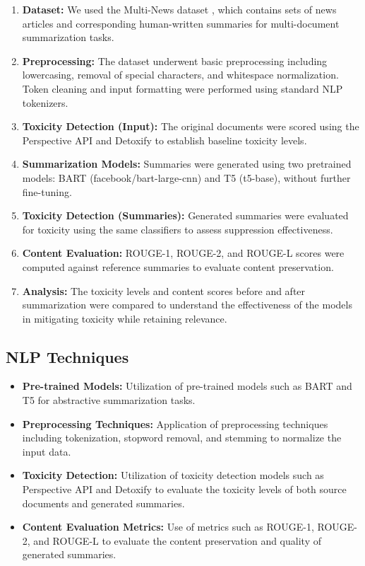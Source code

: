 \documentclass{article}
\begin{document}
\begin{enumerate}
    \item \textbf{Dataset:} We used the Multi-News dataset \cite{alex2019multinews}, which contains sets of news articles and corresponding human-written summaries for multi-document summarization tasks.

    \item \textbf{Preprocessing:} The dataset underwent basic preprocessing including lowercasing, removal of special characters, and whitespace normalization. Token cleaning and input formatting were performed using standard NLP tokenizers.

    \item \textbf{Toxicity Detection (Input):} The original documents were scored using the Perspective API \cite{perspectiveapi} and Detoxify \cite{Detoxify} to establish baseline toxicity levels.

    \item \textbf{Summarization Models:} Summaries were generated using two pretrained models: BART (facebook/bart-large-cnn) and T5 (t5-base), without further fine-tuning.

    \item \textbf{Toxicity Detection (Summaries):} Generated summaries were evaluated for toxicity using the same classifiers to assess suppression effectiveness.

    \item \textbf{Content Evaluation:} ROUGE-1, ROUGE-2, and ROUGE-L \cite{barbella2022rouge} scores were computed against reference summaries to evaluate content preservation.

    \item \textbf{Analysis:}  The toxicity levels and content scores before and after summarization were compared to understand the effectiveness of the models in mitigating toxicity while retaining relevance.
\end{enumerate}


\subsection{NLP Techniques}

\begin{itemize}
    \item \textbf{Pre-trained Models:} Utilization of pre-trained models such as BART \cite{lewis2019bart} and T5 \cite{raffel2020exploring} for abstractive summarization tasks.
    \item \textbf{Preprocessing Techniques:} Application of preprocessing techniques including tokenization, stopword removal, and stemming to normalize the input data.
    \item \textbf{Toxicity Detection:} Utilization of toxicity detection models such as Perspective API and Detoxify to evaluate the toxicity levels of both source documents and generated summaries.
    \item \textbf{Content Evaluation Metrics:} Use of metrics such as ROUGE-1, ROUGE-2, and ROUGE-L to evaluate the content preservation and quality of generated summaries.
\end{itemize}
\end{document}
